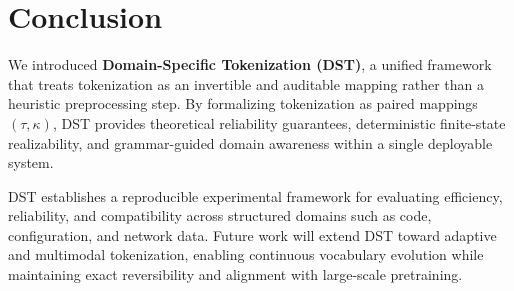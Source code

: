 \section{Conclusion}
\label{sec:conclusion}

We introduced \textbf{Domain-Specific Tokenization (DST)}, a unified framework that treats tokenization as an invertible and auditable mapping rather than a heuristic preprocessing step.
By formalizing tokenization as paired mappings $(\tau,\kappa)$, DST provides theoretical reliability guarantees, deterministic finite-state realizability, and grammar-guided domain awareness within a single deployable system.

DST establishes a reproducible experimental framework for evaluating efficiency, reliability, and compatibility across structured domains such as code, configuration, and network data.
Future work will extend DST toward adaptive and multimodal tokenization, enabling continuous vocabulary evolution while maintaining exact reversibility and alignment with large-scale pretraining.
